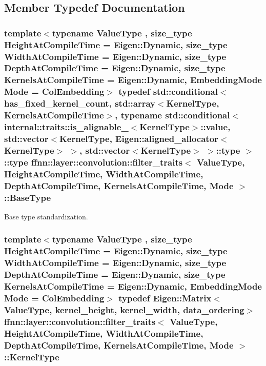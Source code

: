 \subsection{Member Typedef Documentation}
\hypertarget{structffnn_1_1layer_1_1convolution_1_1filter__traits_a102c142c78a1ff6c5063d807bcac1748}{
\subsubsection[{Base\-Type}]{\setlength{\rightskip}{0pt plus 5cm}template$<$typename Value\-Type , size\-\_\-type Height\-At\-Compile\-Time = Eigen\-::\-Dynamic, size\-\_\-type Width\-At\-Compile\-Time = Eigen\-::\-Dynamic, size\-\_\-type Depth\-At\-Compile\-Time = Eigen\-::\-Dynamic, size\-\_\-type Kernels\-At\-Compile\-Time = Eigen\-::\-Dynamic, Embedding\-Mode Mode = Col\-Embedding$>$ typedef std\-::conditional$<$ {\bf has\-\_\-fixed\-\_\-kernel\-\_\-count}, std\-::array$<${\bf Kernel\-Type}, Kernels\-At\-Compile\-Time$>$, typename std\-::conditional$<$ {\bf internal\-::traits\-::is\-\_\-alignable\-\_}$<${\bf Kernel\-Type}$>$\-::value, std\-::vector$<${\bf Kernel\-Type}, Eigen\-::aligned\-\_\-allocator$<${\bf Kernel\-Type}$>$ $>$, std\-::vector$<${\bf Kernel\-Type}$>$ $>$\-::type $>$\-::type {\bf ffnn\-::layer\-::convolution\-::filter\-\_\-traits}$<$ Value\-Type, Height\-At\-Compile\-Time, Width\-At\-Compile\-Time, Depth\-At\-Compile\-Time, Kernels\-At\-Compile\-Time, Mode $>$\-::{\bf Base\-Type}}}\label{structffnn_1_1layer_1_1convolution_1_1filter__traits_a102c142c78a1ff6c5063d807bcac1748}


Base type standardization. 

\hypertarget{structffnn_1_1layer_1_1convolution_1_1filter__traits_aaafe37da4f1d8e85681e791911c73116}{
\subsubsection[{Kernel\-Type}]{\setlength{\rightskip}{0pt plus 5cm}template$<$typename Value\-Type , size\-\_\-type Height\-At\-Compile\-Time = Eigen\-::\-Dynamic, size\-\_\-type Width\-At\-Compile\-Time = Eigen\-::\-Dynamic, size\-\_\-type Depth\-At\-Compile\-Time = Eigen\-::\-Dynamic, size\-\_\-type Kernels\-At\-Compile\-Time = Eigen\-::\-Dynamic, Embedding\-Mode Mode = Col\-Embedding$>$ typedef Eigen\-::\-Matrix$<$Value\-Type, {\bf kernel\-\_\-height}, {\bf kernel\-\_\-width}, {\bf data\-\_\-ordering}$>$ {\bf ffnn\-::layer\-::convolution\-::filter\-\_\-traits}$<$ Value\-Type, Height\-At\-Compile\-Time, Width\-At\-Compile\-Time, Depth\-At\-Compile\-Time, Kernels\-At\-Compile\-Time, Mode $>$\-::{\bf Kernel\-Type}}}\label{structffnn_1_1layer_1_1convolution_1_1filter__traits_aaafe37da4f1d8e85681e791911c73116}


